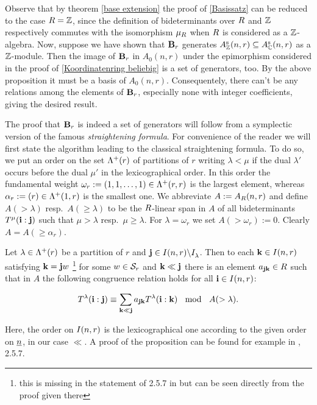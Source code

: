 \documentclass[twoside,12pt]{article}
\begin{document}
Observe that by theorem \ref{base extension} the proof of \ref{Basissatz}
can be reduced to the
case $R={\mathbb Z}$, since the definition of bideterminants over
$R$ and ${\mathbb Z}$ respectively commutes with the isomorphism ${\mu}_{R}$
when $R$ is considered as a ${\mathbb Z}$-algebra. 
Now, suppose we have shown that ${\bf B}_r$ generates $A^{{\rm s}}_{{\mathbb Z}}(n,r)\subseteq A^{{\rm s}}_{{\mathbb C}}(n,r)$ as a ${\mathbb Z}$-module. 
Then the image of ${\bf B}_r$ in $A_0(n,r)$ under the epimorphism
considered in the proof of \ref{Koordinatenring beliebig} is a set of
generators, too. By the above proposition it must be a basis of
$A_0(n,r)$. Consequentely, there can't be any relations among the
elements of ${\bf B}_r$, especially none with integer coefficients, giving
the desired result. \Ab

The proof that ${\bf B}_r$ is indeed a set of generators will follow from a
symplectic version of the famous {\em straightening formula}. For
convenience of the reader we will first state the algorithm leading to the
classical straightening formula. To do so, we put an order on the set
$\Lambda^+(r)$ of partitions of $r$ writing $\lambda < \mu$ if the dual $\lambda'$
occurs before the dual $\mu'$ in the lexicographical order.
In this order the fundamental weight $\omega_r:=(1,1, \ldots , 1)\in
\Lambda^+(r, r)$ is the largest element, whereas $\alpha_r:=(r)\in \Lambda^+(1, r)$ is the
smallest one. We abbreviate $A:=A_{R}(n,r)$ and define $A(>\lambda)$
resp.\ $A(\geq \lambda)$ to be the $R$-linear span in $A$ of all
bideterminants $T^{\mu}({\bf i}:{\bf j})$ such that $\mu > \lambda$
resp.\ $\mu \geq \lambda$. For $\lambda=\omega_r$ we set
$A(>\omega_r):=0$. Clearly $A=A(\geq \alpha_r)$. 

\begin{prop} 
\label{Straightening Algorithmus 1}
Let $\lambda \in \Lambda^+(r)$ be a partition of $r$
and ${\bf j} \in I(n,r) \backslash I_{\lambda}^{}$. Then to each 
${\bf k}\in I(n,r)$ satisfying ${\bf k}={\bf j}w$ 
\footnote{this is missing in the statement of 2.5.7 in \cite{martin}
  but can be seen directly from the proof given there}
for some $w \in {\cal S}_{r}$ and
${\bf k}\ll {\bf j}$ there is an element
$a_{{\bf j}{\bf k}} \in R$ such that
in $A$ the following congruence  relation holds
 for all ${\bf i}\in I(n,r)$:


\[
T^{\lambda}({\bf i}:{\bf j}) 
\equiv \sum_{{\bf k}\ll {\bf j}} a_{{\bf j}{\bf k}}
T^{\lambda}({\bf i}:{\bf k}) \; \; \mbox{ mod } \; \; A(>\lambda) .
\]
\end{prop}

Here, the order on $I(n,r)$ is the lexicographical one according to the
given order on $\underline{n}$, in our case $\ll$. A proof of the proposition can be found for
example in \cite{martin}, 2.5.7.\\
\end{document}
